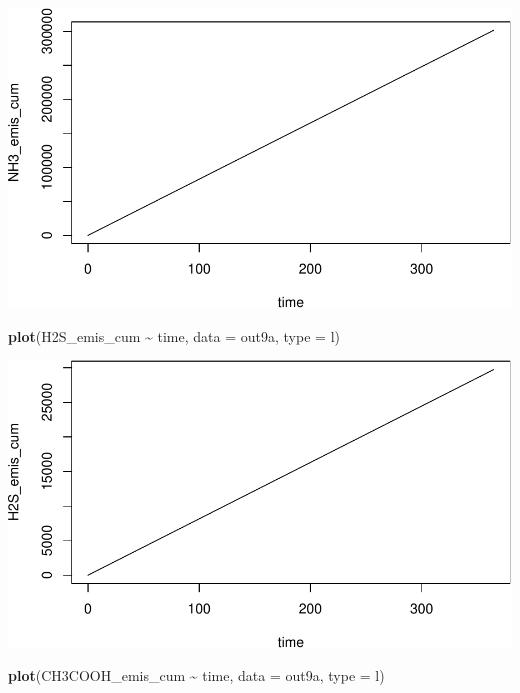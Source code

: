 \documentclass[
]{article}
\newenvironment{Shaded}{\begin{snugshade}}{\end{snugshade}}
\newcommand{\AttributeTok}[1]{\textcolor[rgb]{0.13,0.29,0.53}{#1}}
\newcommand{\FunctionTok}[1]{\textcolor[rgb]{0.13,0.29,0.53}{\textbf{#1}}}
\newcommand{\NormalTok}[1]{#1}
\newcommand{\SpecialCharTok}[1]{\textcolor[rgb]{0.81,0.36,0.00}{\textbf{#1}}}
\newcommand{\StringTok}[1]{\textcolor[rgb]{0.31,0.60,0.02}{#1}}
\begin{document}
\includegraphics{simple_demo_files/figure-latex/unnamed-chunk-64-3.pdf}

\begin{Shaded}
\begin{Highlighting}[]
\FunctionTok{plot}\NormalTok{(H2S\_emis\_cum }\SpecialCharTok{\textasciitilde{}}\NormalTok{ time, }\AttributeTok{data =}\NormalTok{ out9a, }\AttributeTok{type =} \StringTok{\textquotesingle{}l\textquotesingle{}}\NormalTok{)}
\end{Highlighting}
\end{Shaded}

\includegraphics{simple_demo_files/figure-latex/unnamed-chunk-64-4.pdf}

\begin{Shaded}
\begin{Highlighting}[]
\FunctionTok{plot}\NormalTok{(CH3COOH\_emis\_cum }\SpecialCharTok{\textasciitilde{}}\NormalTok{ time, }\AttributeTok{data =}\NormalTok{ out9a, }\AttributeTok{type =} \StringTok{\textquotesingle{}l\textquotesingle{}}\NormalTok{)}
\end{Highlighting}
\end{Shaded}
\end{document}
